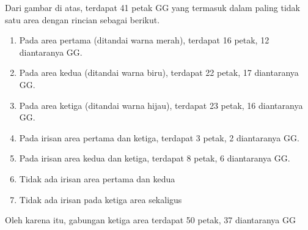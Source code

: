 \documentclass{article}
\begin{document}
Dari gambar di atas, terdapat 41 petak GG yang termasuk dalam paling tidak satu area dengan rincian sebagai berikut.
\begin{enumerate}
  \item Pada area pertama (ditandai warna merah), terdapat 16 petak, 12 diantaranya GG.
  \item Pada area kedua (ditandai warna biru), terdapat 22 petak, 17 diantaranya GG.
  \item Pada area ketiga (ditandai warna hijau), terdapat 23 petak, 16 diantaranya GG.
  \item Pada irisan area pertama dan ketiga, terdapat 3 petak, 2 diantaranya GG.
  \item Pada irisan area kedua dan ketiga, terdapat 8 petak, 6 diantaranya GG.
  \item Tidak ada irisan area pertama dan kedua
  \item Tidak ada irisan pada ketiga area sekaligus
\end{enumerate}

Oleh karena itu, gabungan ketiga area terdapat 50 petak, 37 diantaranya GG
\end{document}
